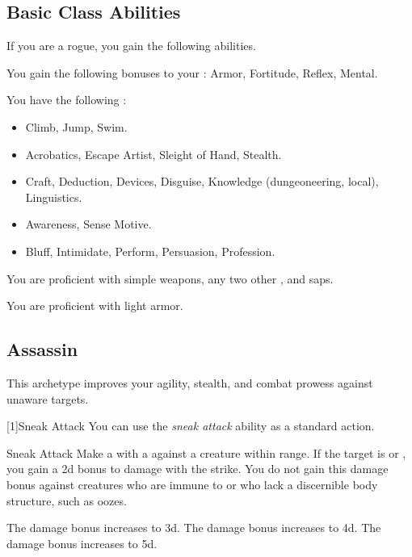     \subsection{Basic Class Abilities}
        If you are a rogue, you gain the following abilities.

        You gain the following bonuses to your :  Armor,  Fortitude,  Reflex,  Mental.

        You have the following :
        \begin{itemize}
            \item {} Climb, Jump, Swim.
            \item {} Acrobatics, Escape Artist, Sleight of Hand, Stealth.
            \item {} Craft, Deduction, Devices, Disguise, Knowledge (dungeoneering, local), Linguistics.
            \item {} Awareness, Sense Motive.
            \item {} Bluff, Intimidate, Perform, Persuasion, Profession.
        \end{itemize}

        You are proficient with simple weapons, any two other , and saps.

        You are proficient with light armor.

    \subsection{Assassin}
        This archetype improves your agility, stealth, and combat prowess against unaware targets.

        [1]{Sneak Attack} You can use the \textit{sneak attack} ability as a standard action.
        \begin{freeability}{Sneak Attack}
            Make a  with a  against a creature within \rngclose range.
            If the target is \unaware or , you gain a \plus2d bonus to damage with the strike.
            You do not gain this damage bonus against creatures who are immune to  or who lack a discernible body structure, such as oozes.

            \rankline
             The damage bonus increases to \plus3d.
             The damage bonus increases to \plus4d.
             The damage bonus increases to \plus5d.
        \end{freeability}

